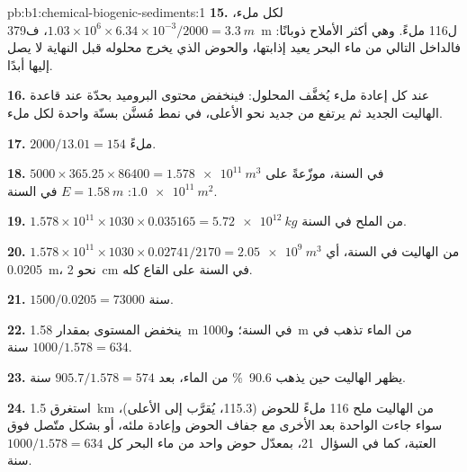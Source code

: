 \begin{solution}{pb:b1:chemical-biogenic-sediments:1}
\textbf{15.} لكل ملء، $1.03\times10^6\times6.34\times10^{-3}/2000 =
\qty{3.3}{m}$، ف\qty{379}{m} ل\num{116} ملءً. وهي أكثر الأملاح ذوبانًا: فالداخل التالي من ماء البحر يعيد إذابتها، والحوض الذي يخرج محلوله قبل النهاية لا يصل إليها أبدًا.

\textbf{16.} عند كل إعادة ملء يُخفَّف المحلول: فينخفض محتوى البروميد بحدّة عند قاعدة الهاليت الجديد ثم يرتفع من جديد نحو الأعلى، في نمط مُسنَّن بسنّة واحدة لكل ملء.

\textbf{17.} $2000/13.01 = 154$ ملءً.

\textbf{18.} $5000\times365.25\times86400 = \qty{1.578e11}{m^3}$ في السنة، موزّعةً على $\qty{1.0e11}{m^2}$: $E = \qty{1.58}{m}$ في السنة.

\textbf{19.} $1.578\times10^{11}\times1030\times0.035165 = \qty{5.72e12}{kg}$ من الملح في السنة.

\textbf{20.} $1.578\times10^{11}\times1030\times0.02741/2170 =
\qty{2.05e9}{m^3}$ من الهاليت في السنة، أي \qty{0.0205}{m}، نحو \qty{2}{cm} في السنة على القاع كله.

\textbf{21.} $1500/0.0205 = \num{73000}$ سنة.

\textbf{22.} ينخفض المستوى بمقدار \qty{1.58}{m} في السنة؛ و\qty{1000}{m} من الماء تذهب في $1000/1.578 = 634$ سنة.

\textbf{23.} يظهر الهاليت حين يذهب \qty{90.6}{\%} من الماء، بعد $905.7/1.578 = 574$ سنة.

\textbf{24.} استغرق \qty{1.5}{km} من الهاليت ملح 116 ملءً للحوض (\num{115.3}، يُقرَّب إلى الأعلى)، سواء جاءت الواحدة بعد الأخرى مع جفاف الحوض وإعادة ملئه، أو بشكل متّصل فوق العتبة، كما في السؤال~21، بمعدّل حوض واحد من ماء البحر كل $1000/1.578 = 634$ سنة.
\end{solution}
